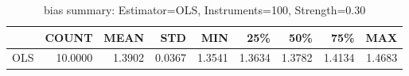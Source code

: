 \begin{table}[ht]
\centering
\caption{bias summary: Estimator=OLS, Instruments=100, Strength=0.30}
\begin{tabular}{lrrrrrrrr}
\toprule
 & COUNT & MEAN & STD & MIN & 25\% & 50\% & 75\% & MAX \\
\midrule
OLS & 10.0000 & 1.3902 & 0.0367 & 1.3541 & 1.3634 & 1.3782 & 1.4134 & 1.4683 \\
\bottomrule
\end{tabular}
\end{table}
